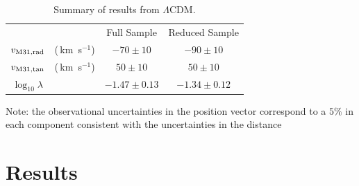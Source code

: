 \documentclass{emulateapj}
\newcommand{\kms}{\,km~s$^{-1}$}
\begin{document}
\begin{table}
\caption{Summary of results from $\Lambda$CDM.}
\begin{center}
\begin{tabular}{cccc}\hline
 &  & Full Sample & Reduced Sample\\
$v_{\rm M31,rad}$ &(\kms) & $-70\pm 10$ & $-90\pm 10$\\
$v_{\rm M31,tan}$ &(\kms) & $50\pm 10$ & $50\pm 10$\\
$\log_{10}\lambda$& & $-1.47\pm 0.13$& $-1.34\pm 0.12$\\\hline
\end{tabular}
\end{center}
\vspace{1mm}
Note: the observational uncertainties in the position vector
correspond to a $5\%$ in each component consistent with the
uncertainties in the distance \citep[see references
  in][]{vanderMarel08} 

\label{table:2}
\end{table}


\section{Results}
\label{sec:results}
\end{document}
